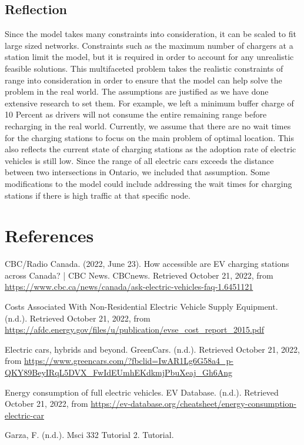 \documentclass[12pt, fleqn]{article}
\begin{document}
\subsection{Reflection}

Since the model takes many constraints into consideration, it can be scaled to fit large sized networks.
Constraints such as the maximum number of chargers at a station limit the model, but it is required in order
to account for any unrealistic feasible solutions. This multifaceted problem takes the realistic constraints
of range into consideration in order to ensure that the model can help solve the problem in the real world.
The assumptions are justified as we have done extensive research to set them. For example, we left a minimum
buffer charge of 10 Percent as drivers will not consume the entire remaining range before recharging in the real
world. Currently, we assume that there are no wait times for the charging stations to focus on the main problem of
optimal location. This also reflects the current state of charging stations as the adoption rate of electric vehicles
is still low. Since the range of all electric cars exceeds the distance between two intersections in Ontario, we included
that assumption. Some modifications to the model could include addressing the wait times for charging stations if there is
high traffic at that specific node.


\break
\section{References}

CBC/Radio Canada. (2022, June 23). How accessible are EV charging stations across Canada? | CBC News. CBCnews. Retrieved October 21, 2022, from \url{https://www.cbc.ca/news/canada/ask-electric-vehicles-faq-1.6451121}

Costs Associated With Non-Residential Electric Vehicle Supply Equipment. (n.d.). Retrieved October 21, 2022, from \url{https://afdc.energy.gov/files/u/publication/evse_cost_report_2015.pdf}

Electric cars, hybrids and beyond. GreenCars. (n.d.). Retrieved October 21, 2022, from \url{https://www.greencars.com/?fbclid=IwAR1Lg6G58a4_p-QKY89BeyIRqL5DVX_FwIdEUmhEKdkmjPbuXeaj_Gh6Ang}

Energy consumption of full electric vehicles. EV Database. (n.d.). Retrieved October 21, 2022, from \url{https://ev-database.org/cheatsheet/energy-consumption-electric-car}

Garza, F. (n.d.). Msci 332 Tutorial 2. Tutorial.
\end{document}
